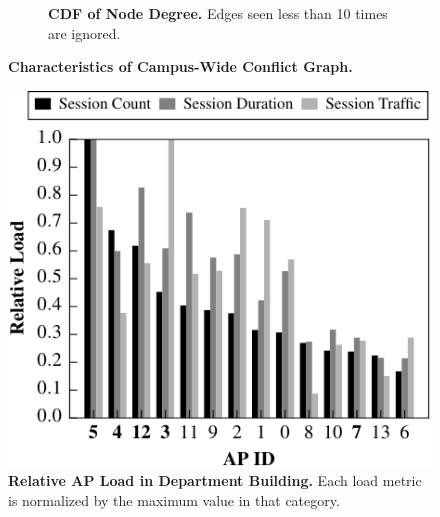 \begin{figure}[t]
\begin{minipage}[b]{0.65\textwidth}
\begin{subfigure}[t]{0.48\textwidth}
      \caption{\textbf{CDF of Node Degree.} Edges seen less than 10 times are
      ignored.}
      \label{fig:campus_node_degree}
    \end{subfigure}%
    \caption{\textbf{Characteristics of Campus-Wide Conflict Graph.}}
  \end{minipage}\hspace{0.01\textwidth}
  \begin{minipage}[b]{0.33\textwidth}
    \includegraphics[width=\textwidth]{./figures/DavisAPLoad.pdf}
    \caption{\textbf{Relative AP Load in Department Building.} Each load metric
      is normalized by the maximum value in that category.}
    \label{fig:load}
  \end{minipage}
  \vspace*{\aftercaptiongap}
\end{figure}


